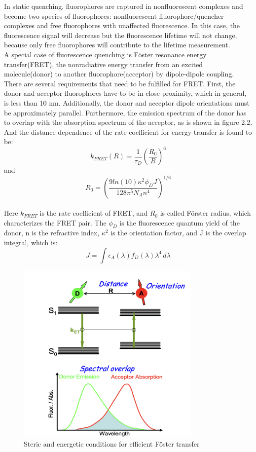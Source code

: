 \documentclass[a4paper,english,12pt,bibliography=totoc]{scrreprt}
\begin{document}
In static quenching, fluorophores are captured in nonfluorescent complexes and become two species of fluorophores: nonfluorescent fluorophore/quencher complexes and free fluorophores with unaffected fluorescence. In this case, the fluorescence signal will decrease but the fluorescence lifetime will not change, because only free fluorophores will contribute to the lifetime measurement.\\

A special case of fluorescence quenching is Föster resonance energy transfer(FRET), the nonradiative energy transfer from an excited molecule(donor) to another fluorophore(acceptor) by dipole-dipole coupling. \\

There are several requirements that need to be fulfilled for FRET. First, the donor and acceptor fluorophores have to be in close proximity, which in general, is less than 10 nm. Additionally, the donor and acceptor dipole orientations must be approximately parallel. Furthermore, the emission spectrum of the donor has to overlap with the absorption spectrum of the acceptor, as is shown in figure 2.2. And the distance dependence of the rate coefficient for energy transfer is found to be:
\[
k_{FRET}(R) = \frac{1}{\tau_D}(\frac{R_0}{R})^6
\]
and
\[
R_0 = (\frac{9ln(10)\kappa^2\phi_DJ}{128\pi^5N_An^4})^{1/6}
\]
\\
Here $k_{FRET}$ is the rate coefficient of FRET, and $R_0$ is called Förster radius, which characterizes the FRET pair. The $\phi_D$ is the fluorescence quantum yield of the donor, n is the refractive index, $\kappa^2$ is the orientation factor, and J is the overlap integral, which is:
\[
J = \int \epsilon_A(\lambda)f_D(\lambda){\lambda}^4\, d\lambda
\]

\begin{figure}[H]
        \centering
        \includegraphics[width=0.8\textwidth]{Figures/FRET.png}
	    \caption{Steric and energetic conditions for efficient Föster transfer\cite{smFRET_lab_script}}
\end{figure}
\end{document}
